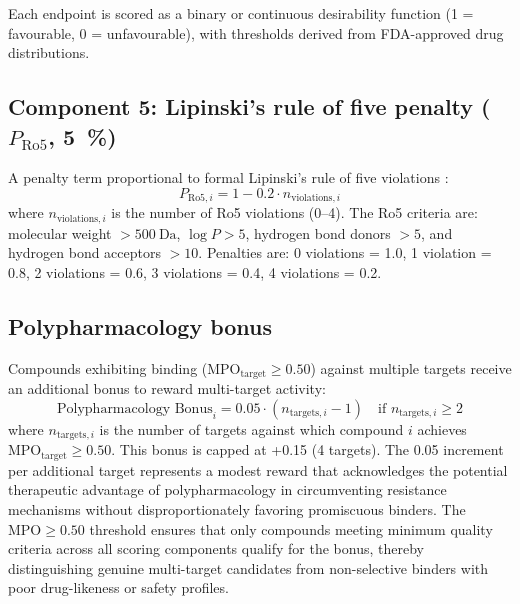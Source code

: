 \documentclass[journal=jcisd8,manuscript=suppinfo]{achemso}
\begin{document}
Each endpoint is scored as a binary or continuous desirability function (\num{1} = favourable, \num{0} = unfavourable), with thresholds derived from FDA-approved drug distributions.

\subsection*{Component 5: Lipinski's rule of five penalty ($P_{\text{Ro5}}$, \qty{5}{\percent})}

A penalty term proportional to formal Lipinski's rule of five violations \cite{Lipinski2004}:
\begin{equation}
P_{\text{Ro5}, i} = 1 - 0.2 \cdot n_{\text{violations}, i}
\label{eq:ro5}
\end{equation}
where $n_{\text{violations}, i}$ is the number of Ro5 violations (\numrange{0}{4}). The Ro5 criteria are: molecular weight $> \qty{500}{\dalton}$, $\log P > \num{5}$, hydrogen bond donors $> \num{5}$, and hydrogen bond acceptors $> \num{10}$. Penalties are: \num{0} violations = \num{1.0}, \num{1} violation = \num{0.8}, \num{2} violations = \num{0.6}, \num{3} violations = \num{0.4}, \num{4} violations = \num{0.2}.

\subsection*{Polypharmacology bonus}

Compounds exhibiting binding ($\text{MPO}_{\text{target}} \geq \num{0.50}$) against multiple targets receive an additional bonus to reward multi-target activity:
\begin{equation}
\text{Polypharmacology Bonus}_i = 0.05 \cdot (n_{\text{targets}, i} - 1) \quad \text{if } n_{\text{targets}, i} \geq 2
\label{eq:poly_bonus}
\end{equation}
where $n_{\text{targets}, i}$ is the number of targets against which compound $i$ achieves $\text{MPO}_{\text{target}} \geq \num{0.50}$. This bonus is capped at +0.15 (\num{4} targets). The \num{0.05} increment per additional target represents a modest reward that acknowledges the potential therapeutic advantage of polypharmacology in circumventing resistance mechanisms without disproportionately favoring promiscuous binders. The $\text{MPO} \geq \num{0.50}$ threshold ensures that only compounds meeting minimum quality criteria across all scoring components qualify for the bonus, thereby distinguishing genuine multi-target candidates from non-selective binders with poor drug-likeness or safety profiles.
\end{document}
